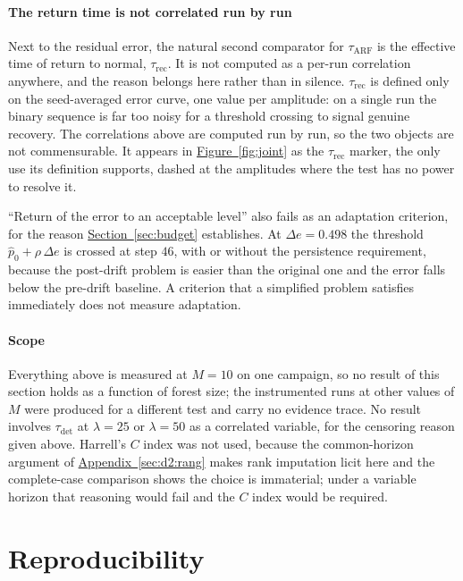 \documentclass[10pt,conference]{IEEEtran}
\theoremstyle{definition}
\begin{document}
\paragraph{The return time is not correlated run by run} Next to the residual error,
the natural second comparator for $\tau_{\mathrm{ARF}}$ is the effective time of return
to normal, $\tau_{\mathrm{rec}}$. It is not computed as a per-run correlation anywhere, and the reason belongs here rather than in silence.
$\tau_{\mathrm{rec}}$ is defined only on the seed-averaged error curve, one value per
amplitude: on a single run the binary sequence is far too noisy for a threshold crossing to
signal genuine recovery. The correlations above are computed run by run, so the two objects
are not commensurable. It appears in \hyperref[fig:joint]{Figure~\ref*{fig:joint}} as the $\tau_{\mathrm{rec}}$
marker, the only use its definition supports, dashed at the amplitudes where the test has
no power to resolve it.

``Return of the error to an acceptable level'' also fails as an adaptation criterion, for
the reason \hyperref[sec:budget]{Section~\ref*{sec:budget}} establishes. At $\Delta e = 0.498$ the threshold
$\hat p_0 + \rho\,\Delta e$ is crossed at step $46$, with or without the persistence
requirement, because the post-drift problem is easier than the original one and the error
falls below the pre-drift baseline. A criterion that a simplified problem satisfies
immediately does not measure adaptation.

\paragraph{Scope} Everything above is measured at $M = 10$ on one campaign, so no result
of this section holds as a function of forest size; the instrumented runs at other values
of $M$ were produced for a different test and carry no evidence trace. No result involves
$\tau_{\mathrm{det}}$ at $\lambda = 25$ or $\lambda = 50$ as a correlated variable, for the
censoring reason given above. Harrell's $C$ index was not used, because the common-horizon
argument of \hyperref[sec:d2:rang]{Appendix~\ref*{sec:d2:rang}} makes rank imputation licit here and the
complete-case comparison shows the choice is immaterial; under a variable horizon that
reasoning would fail and the $C$ index would be required.

\section{Reproducibility}
\label{app:repro}
\end{document}
